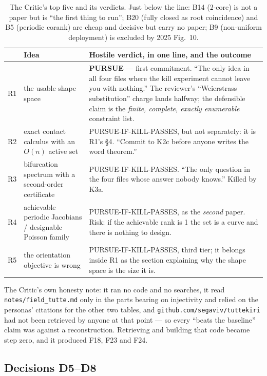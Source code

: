 \documentclass[10pt,a4paper]{article}
\newcommand{\fn}[1]{\nolinkurl{#1}}
\begin{document}
\begin{table}[h]\centering\small
\begin{tabular}{@{}p{6mm}p{32mm}p{112mm}@{}}
\toprule
& Idea & Hostile verdict, in one line, and the outcome \\
\midrule
R1 & the usable shape space & \textbf{PURSUE} --- first commitment. ``The only idea in all four files where the kill experiment cannot leave you with nothing.'' The reviewer's ``Weierstrass substitution'' charge lands halfway; the defensible claim is the \emph{finite, complete, exactly enumerable} constraint list. \\
R2 & exact contact calculus with an $O(n)$ active set & PURSUE-IF-KILL-PASSES, but not separately: it is R1's \S4. ``Commit to K2c before anyone writes the word theorem.'' \\
R3 & bifurcation spectrum with a second-order certificate & PURSUE-IF-KILL-PASSES. ``The only question in the four files whose answer nobody knows.'' Killed by K3a. \\
R4 & achievable periodic Jacobians / designable Poisson family & PURSUE-IF-KILL-PASSES, as the \emph{second} paper. Risk: if the achievable rank is 1 the set is a curve and there is nothing to design. \\
R5 & the orientation objective is wrong & PURSUE-IF-KILL-PASSES, third tier; it belongs inside R1 as the section explaining why the shape space is the size it is. \\
\bottomrule
\end{tabular}
\caption{The Critic's top five and its verdicts. Just below the line: B14 (2-core) is not a
paper but is ``the first thing to run''; B20 (fully closed as root coincidence) and B5
(periodic corank) are cheap and decisive but carry no paper; B9 (non-uniform deployment) is
excluded by 2025 Fig.~10.}
\end{table}

The Critic's own honesty note: it ran no code and no searches, it read
\fn{notes/field_tutte.md} only in the parts bearing on injectivity and relied on the personas'
citations for the other two tables, and \fn{github.com/segaviv/tuttekiri} had not been retrieved
by anyone at that point --- so every ``beats the baseline'' claim was against a reconstruction.
Retrieving and building that code became step zero, and it produced F18, F23 and F24.

\subsection{Decisions D5--D8}
\end{document}
